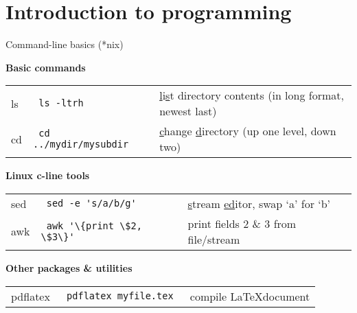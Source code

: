 

\section{Introduction to programming}
\begin{frame}{\insertsectionnumber{ |} Command-line basics (*nix)}

\hspace*{-0.5cm}\textbf{Basic commands} \\
\begin{tabular}{p{1.5cm} p{3.5cm} p{5cm}}
ls & \Verb+ ls -ltrh + & \underline{l}i\underline{s}t directory contents (in long format, newest last) \\
cd & \Verb+ cd ../mydir/mysubdir + & \underline{c}hange \underline{d}irectory (up one level, down two) \\

\end{tabular}


\hspace*{-0.5cm}\textbf{Linux c-line tools} \\
\begin{tabular}{p{1.5cm} p{3.5cm} p{5cm}}
sed & \Verb+ sed -e 's/a/b/g'+ & \underline{s}tream \underline{ed}itor, swap `a' for `b' \\
awk & \Verb+ awk '\{print \$2, \$3\}'+ & print fields 2 \& 3 from file/stream \\
\end{tabular}

\hspace*{-0.5cm}\textbf{Other packages \& utilities} \\
\begin{tabular}{p{1.5cm} p{3.5cm} p{5cm}}
pdflatex & \Verb+ pdflatex myfile.tex + & compile \LaTeX document \\
\end{tabular}


\end{frame}


